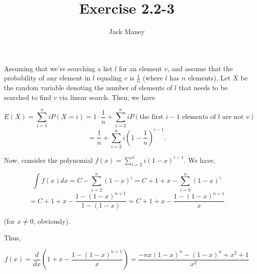 \documentclass{article}
\begin{document}
\title{Exercise 2.2-3}
\author{Jack Maney}
\maketitle

Assuming that we're searching a list $l$ for an element $v$, and assume that the probability of any element in $l$ equaling $v$ is $\frac{1}{n}$ (where $l$ has $n$ elements). Let $X$ be the random variable denoting the number of elements of $l$ that needs to be searched to find $v$ via linear search. Then, we have

\[
	E(X) = \sum\limits_{i=1}^n i P(X=i) = 1 \cdot \frac{1}{n} + \sum\limits_{i=2}^n i P(\textrm{the first } i-1 \textrm{ elements of } l \textrm{ are not } v)
\]
\[
	= \frac{1}{n} + \sum\limits_{i=2}^n i \left(1 - \frac{1}{n}\right)^{i-1}.
\]

Now, consider the polynomial $f(x) = \sum\limits_{i=2}^{n} i (1-x)^{i-1}$. We have,

\[
	\int f(x) dx = C - \sum\limits_{i=2}^n (1-x)^i = C + 1 + x - \sum\limits_{i=0}^n (1-x)^i 
\]
\[
	= C + 1 + x - \frac{1 - (1-x)^{n+1}}{1 - (1-x)} = C + 1 + x - \frac{ 1 - (1-x)^{n + 1}}{x}
\]

\noindent (for $x\not=0$, obviously).

Thus,

\[
	f(x) = \frac{d}{dx}\left( 1 + x - \frac{ 1 - (1-x)^{n + 1}}{x} \right)
	= \frac{-nx(1-x)^n - (1-x)^n + x^2 + 1}{x^2}
\]
\end{document}
